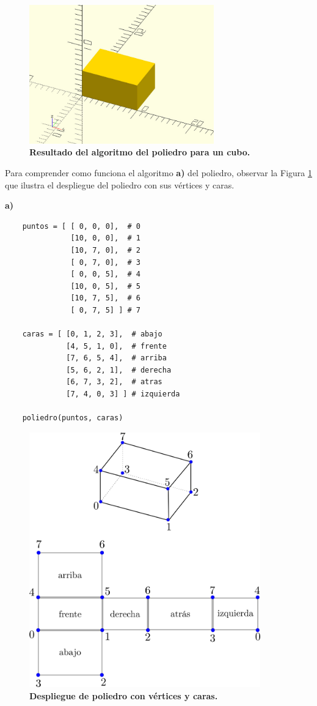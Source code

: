 \begin{figure}[h]
\includegraphics[width=8cm]{Img/Modelos/modelado9.jpg}
\centering
\caption{\textbf{\footnotesize{Resultado del algoritmo del poliedro para un cubo.}}}
\end{figure}

Para comprender como funciona el algoritmo \textbf{a)} del poliedro, observar la Figura \ref{fig:poliedrodes} que ilustra el despliegue del poliedro con sus vértices y caras.

\clearpage
\textbf{a)}
\begin{verbatim}
    puntos = [ [ 0, 0, 0],  # 0
               [10, 0, 0],  # 1
               [10, 7, 0],  # 2
               [ 0, 7, 0],  # 3
               [ 0, 0, 5],  # 4
               [10, 0, 5],  # 5
               [10, 7, 5],  # 6
               [ 0, 7, 5] ] # 7
  
    caras = [ [0, 1, 2, 3],  # abajo
              [4, 5, 1, 0],  # frente
              [7, 6, 5, 4],  # arriba
              [5, 6, 2, 1],  # derecha
              [6, 7, 3, 2],  # atras
              [7, 4, 0, 3] ] # izquierda
  
    poliedro(puntos, caras)

\end{verbatim}

\begin{figure}[h]
\includegraphics[width=10cm]{Img/Modelos/modelado8.png}
\centering
\caption{\textbf{ \footnotesize{Despliegue de poliedro con vértices y caras.}}}
\label{fig:poliedrodes}
\end{figure}

